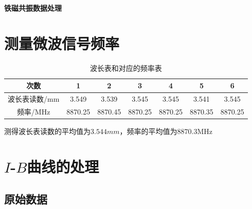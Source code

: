 \documentclass[a4paper,UTF8]{ctexart}
\begin{document}
\begin{center}
    \textbf{\Large 铁磁共振数据处理}
    \par {}
\end{center}

\section{测量微波信号频率}

\begin{table}[H]
    \centering
    \begin{tabular}{|c|c|c|c|c|c|c|}
    \hline
        次数 & 1 & 2 & 3 & 4 & 5 & 6 \\ \hline
        波长表读数/mm & 3.549 & 3.539 & 3.545 & 3.545 & 3.541 & 3.545 \\ \hline
        频率/MHz & 8870.25 & 8870.45 & 8870.25 & 8870.25 & 8870.35 & 8870.25 \\ \hline
    \end{tabular}
    \caption{波长表和对应的频率表}
\end{table}

测得波长表读数的平均值为$3.544mm$，频率的平均值为$8870.3$MHz

\section{$I$-$B$曲线的处理}

\subsection{原始数据}
\end{document}
